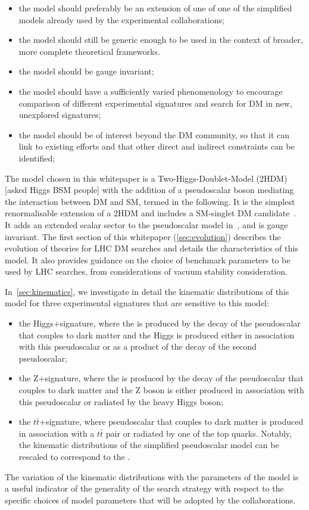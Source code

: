 \begin{itemize}
\item the model should preferably be an extension of one of one of the simplified models already used by the experimental collaborations;
\item the model should still be generic enough to be used in the context of broader, more complete theoretical frameworks.  
\item the model should be gauge invariant;
\item the model should have a sufficiently varied phenomenology to encourage comparison of different experimental signatures and search for DM in new, unexplored signatures;
\item the model should be of interest beyond the DM community, so that it can link to existing efforts and that other direct and indirect constraints can be identified;
\end{itemize}

The model chosen in this whitepaper is a Two-Higgs-Doublet-Model (2HDM)~\cite{deFlorian:2016spz} [asked Higgs BSM people] with the addition of a pseudoscalar boson mediating the interaction between DM and SM, termed \hdma in the following. 
It is the simplest renormalisable extension of a 2HDM and includes a SM-singlet DM candidate~\cite{Ipek:2014gua,No:2015xqa,Goncalves:2016iyg,Bauer:2017ota,Tunney:2017yfp}. 
It adds an extended scalar sector to the pseudoscalar model in~\cite{Abercrombie:2015wmb,Buckley:2014fba}, and is gauge invariant. The first section of this whitepaper (\autoref{sec:evolution}) describes the evolution of theories for 
LHC DM searches and details the characteristics of this model. 
It also provides guidance on the choice of benchmark parameters to be used by LHC searches, from considerations of vacuum stability consideration. 

In~\autoref{sec:kinematics}, we investigate in detail the kinematic distributions of this model for three experimental signatures that are sensitive to this model: 
\begin{itemize}
\item the Higgs+\MET signature, where the \MET is produced by the decay of the pseudoscalar that couples to dark matter and the Higgs is produced either in association with this pseudoscalar or as a product of the decay of the second pseudoscalar; 
\item the Z+\MET signature, where the \MET is produced by the decay of the pseudoscalar that couples to dark matter and the Z boson is either produced in association with this pseudoscalar or radiated by the heavy Higgs boson; 
\item the $t\bar{t}$+\MET signature, where pseudoscalar that couples to dark matter is produced in association with a $t\bar{t}$ pair or radiated by one of the top quarks. Notably, the kinematic distributions of the simplified pseudoscalar model can be rescaled to correspond to the \hdma. 
\end{itemize}
The variation of the kinematic distributions with the parameters of the model is a useful indicator of the generality of the search strategy with respect to the specific choices of model parameters that will be adopted by the collaborations. 

